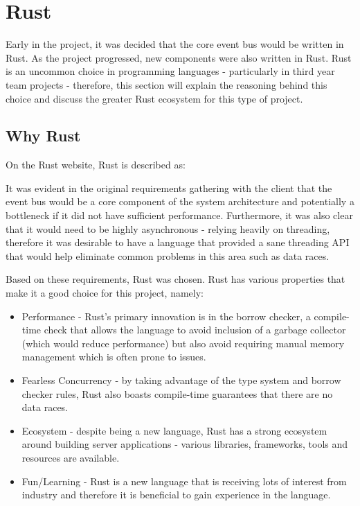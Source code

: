 \documentclass{l3proj}
\begin{document}
\section{Rust}
\label{sec:rust}
Early in the project, it was decided that the core event bus would be written in Rust. As the project progressed, new components were also written in Rust. Rust is an uncommon choice in programming languages - particularly in third year team projects - therefore, this section will explain the reasoning behind this choice and discuss the greater Rust ecosystem for this type of project.

\subsection{Why Rust}
On the Rust website, Rust \cite{rust} is described as:


It was evident in the original requirements gathering with the client that the event bus would be a core component of the system architecture and potentially a bottleneck if it did not have sufficient performance. Furthermore, it was also clear that it would need to be highly asynchronous - relying heavily on threading, therefore it was desirable to have a language that provided a sane threading API that would help eliminate common problems in this area such as data races.

Based on these requirements, Rust was chosen. Rust has various properties that make it a good choice for this project, namely:

\begin{itemize}
    \item Performance - Rust's primary innovation is in the borrow checker, a compile-time check that allows the language to avoid inclusion of a garbage collector (which would reduce performance) but also avoid requiring manual memory management which is often prone to issues.
    \item Fearless Concurrency - by taking advantage of the type system and borrow checker rules, Rust also boasts compile-time guarantees that there are no data races.
    \item Ecosystem - despite being a new language, Rust has a strong ecosystem around building server applications - various libraries, frameworks, tools and resources are available.
    \item Fun/Learning - Rust is a new language that is receiving lots of interest from industry and therefore it is beneficial to gain experience in the language.
\end{itemize}
\end{document}

